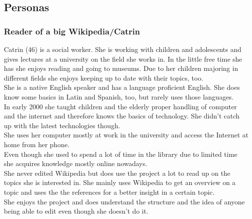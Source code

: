 \documentclass[11pt]{article}
\begin{document}
  \subsection{Personas}

  \subsubsection{Reader of a big Wikipedia/Catrin}
  Catrin (46) is a social worker. She is working with children and adolescents and gives lectures at a university on the field she works in. In the little free time she has she enjoys reading and going to museums. Due to her children majoring in different fields she enjoys keeping up to date with their topics, too. \\
  She is a native English speaker and has a language proficient English. She does know some basics in Latin and Spanish, too, but rarely uses those languages. \\
  In early 2000 she taught children and the elderly proper handling of computer and the internet and therefore knows the basics of technology. She didn't catch up with the latest technologies though. \\
  She uses her computer mostly at work in the university and access the Internet at home from her phone. \\
  Even though she used to spend a lot of time in the library due to limited time she acquires knowledge mostly online nowadays. \\
  She never edited Wikipedia but does use the project a lot to read up on the topics she is interested in. She mainly uses Wikipedia to get an overview on a topic and uses the the references for a better insight in a certain topic. \\
  She enjoys the project and does understand the structure and the idea of anyone being able to edit even though she doesn't do it. \\
\end{document}
